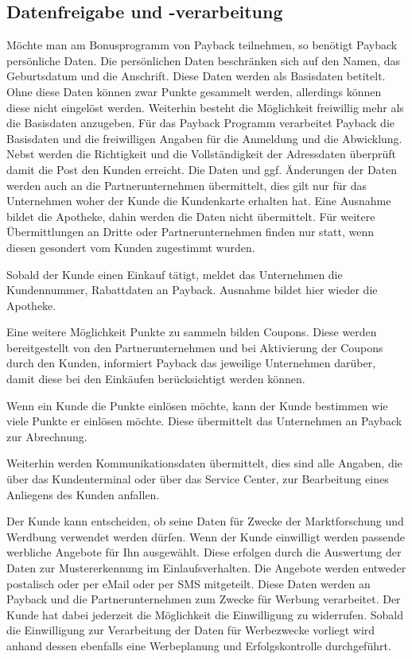 \subsection{Datenfreigabe und -verarbeitung}
Möchte man am Bonusprogramm von Payback teilnehmen, so benötigt Payback persönliche Daten. Die persönlichen Daten beschränken sich auf den Namen, das Geburtsdatum und die Anschrift. Diese Daten werden als Basisdaten betitelt. Ohne diese Daten können zwar Punkte gesammelt werden, allerdings können diese nicht eingelöst werden. Weiterhin besteht die Möglichkeit freiwillig mehr als die Basisdaten anzugeben. Für das Payback Programm verarbeitet Payback die Basisdaten und die freiwilligen Angaben für die Anmeldung und die Abwicklung. Nebst werden die Richtigkeit und die Vollständigkeit der Adressdaten überprüft damit die Post den Kunden erreicht. Die Daten und ggf. Änderungen der Daten werden auch an die Partnerunternehmen übermittelt, dies gilt nur für das Unternehmen woher der Kunde die Kundenkarte erhalten hat. Eine Ausnahme bildet die Apotheke, dahin werden die Daten nicht übermittelt. Für weitere Übermittlungen an Dritte oder Partnerunternehmen finden nur statt, wenn diesen gesondert vom Kunden zugestimmt wurden. \newline

\noindent Sobald der Kunde einen Einkauf tätigt, meldet das Unternehmen die Kundennummer, Rabattdaten an Payback.  Ausnahme bildet hier wieder die Apotheke. \newline

\noindent Eine weitere Möglichkeit Punkte zu sammeln bilden Coupons. Diese werden bereitgestellt von den Partnerunternehmen und bei Aktivierung der Coupons durch den Kunden, informiert Payback das jeweilige Unternehmen darüber, damit diese bei den Einkäufen berücksichtigt werden können. \newline

\noindent Wenn ein Kunde die Punkte einlösen möchte, kann der Kunde bestimmen wie viele Punkte er einlösen möchte. Diese übermittelt das Unternehmen an Payback zur Abrechnung. \newline

\noindent Weiterhin werden Kommunikationsdaten übermittelt, dies sind alle Angaben, die über das Kundenterminal oder über das Service Center, zur Bearbeitung eines Anliegens des Kunden anfallen. \newline

\noindent Der Kunde kann entscheiden, ob seine Daten für Zwecke der Marktforschung und Werdbung verwendet werden dürfen. Wenn der Kunde einwilligt werden passende werbliche Angebote für Ihn ausgewählt. Diese erfolgen durch die Auswertung der Daten zur Mustererkennung im Einlaufsverhalten. Die Angebote werden entweder postalisch oder per eMail oder per SMS mitgeteilt. Diese Daten werden an Payback und die Partnerunternehmen zum Zwecke für Werbung verarbeitet. Der Kunde hat dabei jederzeit die Möglichkeit die Einwilligung zu widerrufen. Sobald die Einwilligung zur Verarbeitung der Daten für Werbezwecke vorliegt wird anhand dessen ebenfalls eine Werbeplanung und Erfolgskontrolle durchgeführt. \newline

